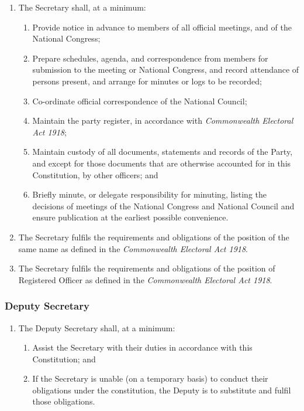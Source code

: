 \documentclass[a4paper,titlepage,8.5pt]{article}
\begin{document}
\begin{enumerate}
\item The Secretary shall, at a minimum:
\begin{enumerate}
\item Provide notice in advance to members of all official meetings, and of the National Congress;
\item Prepare schedules, agenda, and correspondence from members for submission to the meeting or National Congress, and record attendance of persons present, and arrange for minutes or logs to be recorded;
\item Co-ordinate official correspondence of the National Council;
\item Maintain the party register, in accordance with \textit{Commonwealth Electoral Act 1918};
\item Maintain custody of all documents, statements and records of the Party, and except for those documents that are otherwise accounted for in this Constitution, by other officers; and
\item Briefly minute, or delegate responsibility for minuting, listing the decisions of meetings of the National Congress and National Council and ensure publication at the earliest possible convenience.
\end{enumerate}
\item The Secretary fulfils the requirements and obligations of the position of the same name as defined in the \textit{Commonwealth Electoral Act 1918}.
\item The Secretary fulfils the requirements and obligations of the position of Registered Officer as defined in the \textit{Commonwealth Electoral Act 1918}.
\end{enumerate}

\subsubsection{Deputy Secretary}

\begin{enumerate}
\item The Deputy Secretary shall, at a minimum:
\begin{enumerate}
\item Assist the Secretary with their duties in accordance with this Constitution; and
\item If the Secretary is unable (on a temporary basis) to conduct their obligations under the constitution, the Deputy is to substitute and fulfil those obligations.
\end{enumerate}
\end{enumerate}
\end{document}
